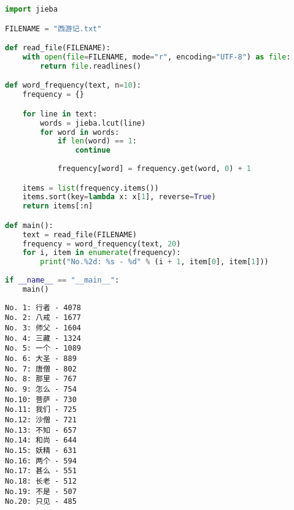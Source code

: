 \begin{lstlisting}[language=Python]
import jieba

FILENAME = "西游记.txt"

def read_file(FILENAME):
    with open(file=FILENAME, mode="r", encoding="UTF-8") as file:
        return file.readlines()

def word_frequency(text, n=10):
    frequency = {}

    for line in text:
        words = jieba.lcut(line)
        for word in words:
            if len(word) == 1:
                continue
            
            frequency[word] = frequency.get(word, 0) + 1

    items = list(frequency.items())
    items.sort(key=lambda x: x[1], reverse=True)
    return items[:n]

def main():
    text = read_file(FILENAME)
    frequency = word_frequency(text, 20)
    for i, item in enumerate(frequency):
        print("No.%2d: %s - %d" % (i + 1, item[0], item[1]))
    
if __name__ == "__main__":
    main()
\end{lstlisting}

\begin{tcolorbox}
    \begin{verbatim}
No. 1: 行者 - 4078
No. 2: 八戒 - 1677
No. 3: 师父 - 1604
No. 4: 三藏 - 1324
No. 5: 一个 - 1089
No. 6: 大圣 - 889
No. 7: 唐僧 - 802
No. 8: 那里 - 767
No. 9: 怎么 - 754
No.10: 菩萨 - 730
No.11: 我们 - 725
No.12: 沙僧 - 721
No.13: 不知 - 657
No.14: 和尚 - 644
No.15: 妖精 - 631
No.16: 两个 - 594
No.17: 甚么 - 551
No.18: 长老 - 512
No.19: 不是 - 507
No.20: 只见 - 485
\end{verbatim}
\end{tcolorbox}

\newpage